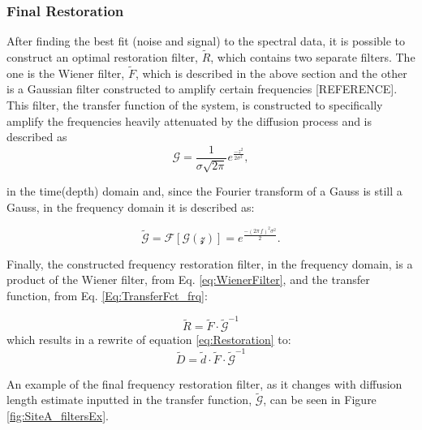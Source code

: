 \documentclass[../../CompleteThesis2/Complete_2ndDraft]{subfiles}
\begin{document}
\subsubsection[Final Restoration][Final Restoration]{Final Restoration}
\label{Subsubsec:SignalAnalysis_BackDiffusion_FinalRestoration}

After finding the best fit (noise and signal) to the spectral data, it is possible to construct an optimal restoration filter, $\tilde{R}$, which contains two separate filters. The one is the Wiener filter, $\tilde{F}$, which is described in the above section and the other is a Gaussian filter constructed to amplify certain frequencies [REFERENCE]. This filter, the transfer function of the system, is constructed to specifically amplify the frequencies heavily attenuated by the diffusion process and is described as
\begin{equation}
	\mathcal{G} = \frac{1}{\sigma\sqrt{2\pi}} e^{\frac{-z^2}{2\sigma^2}},
	\label{Eq:TransferFct_z}
\end{equation}

in the time(depth) domain and, since the Fourier transform of a Gauss is still a Gauss, in the frequency domain it is described as:

\begin{equation}
	\tilde{\mathcal{G}} = \mathcal{F}[\mathcal{G(z)}] = e^{\frac{-(2\pi\, f)^2\sigma^2}{2}}.
	\label{Eq:TransferFct_frq}
\end{equation}

Finally, the constructed frequency restoration filter, in the frequency domain, is a product of the Wiener filter, from Eq. \ref{eq:WienerFilter}, and the transfer function, from Eq. \ref{Eq:TransferFct_frq}:

\begin{equation}
	\tilde{R} =  \tilde{F} \cdot \tilde{\mathcal{G}}^{-1}
\end{equation}
which results in a rewrite of equation \ref{eq:Restoration} to:
\begin{equation}
	\tilde{D} = \tilde{d}\cdot\tilde{F}\cdot\tilde{\mathcal{G}}^{-1}
\end{equation}

An example of the final frequency restoration filter, as it changes with diffusion length estimate inputted in the transfer function, $\tilde{\mathcal{G}}$, can be seen in Figure \ref{fig:SiteA_filtersEx}.
\end{document}
